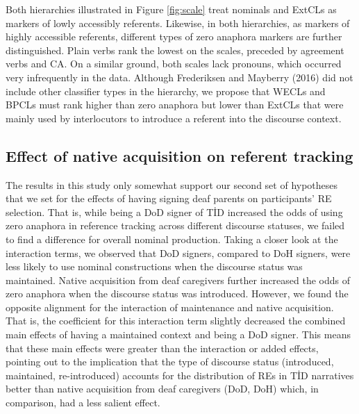\documentclass[]{elsarticle} %
\begin{document}
Both hierarchies illustrated in Figure \ref{fig:scale} treat nominals
and ExtCLs as markers of lowly accessibly referents. Likewise, in both
hierarchies, as markers of highly accessible referents, different types
of zero anaphora markers are further distinguished. Plain verbs rank the
lowest on the scales, preceded by agreement verbs and CA. On a similar
ground, both scales lack pronouns, which occurred very infrequently in
the data. Although Frederiksen and Mayberry (2016) did not include other
classifier types in the hierarchy, we propose that WECLs and BPCLs must
rank higher than zero anaphora but lower than ExtCLs that were mainly
used by interlocutors to introduce a referent into the discourse
context.

\hypertarget{effect-of-native-acquisition-on-referent-tracking}{%
\subsection{Effect of native acquisition on referent
tracking}\label{effect-of-native-acquisition-on-referent-tracking}}

The results in this study only somewhat support our second set of
hypotheses that we set for the effects of having signing deaf parents on
participants' RE selection. That is, while being a DoD signer of TİD
increased the odds of using zero anaphora in reference tracking across
different discourse statuses, we failed to find a difference for overall
nominal production. Taking a closer look at the interaction terms, we
observed that DoD signers, compared to DoH signers, were less likely to
use nominal constructions when the discourse status was maintained.
Native acquisition from deaf caregivers further increased the odds of
zero anaphora when the discourse status was introduced. However, we
found the opposite alignment for the interaction of maintenance and
native acquisition. That is, the coefficient for this interaction term
slightly decreased the combined main effects of having a maintained
context and being a DoD signer. This means that these main effects were
greater than the interaction or added effects, pointing out to the
implication that the type of discourse status (introduced, maintained,
re-introduced) accounts for the distribution of REs in TİD narratives
better than native acquisition from deaf caregivers (DoD, DoH) which, in
comparison, had a less salient effect.
\end{document}
